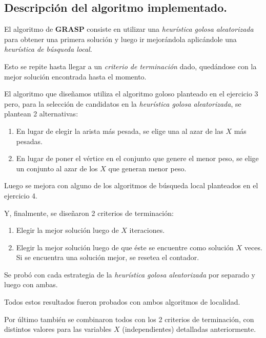 \subsection{Descripción del algoritmo implementado.}
\vspace*{0.3cm}

El algoritmo de \textbf{GRASP} consiste en utilizar una
\textit{heurística golosa aleatorizada} para obtener una primera solución
y luego ir mejorándola aplicándole una \textit{heurística de búsqueda local}.

Esto se repite hasta llegar a un \textit{criterio de terminación} dado,
quedándose con la mejor solución encontrada hasta el momento.

El algoritmo que diseñamos utiliza el algoritmo goloso planteado en el
ejercicio 3 pero, para la selección de candidatos en la \textit{heurística
golosa aleatorizada}, se plantean 2 alternativas:

\begin{enumerate}
\item En lugar de elegir la arista más pesada, se elige una al azar de las
$X$ más pesadas.

\item En lugar de poner el vértice en el conjunto que genere el menor peso,
se elige un conjunto al azar de los $X$ que generan menor peso.
\end{enumerate}

Luego se mejora con alguno de los algoritmos de búsqueda local planteados
en el ejercicio 4.

Y, finalmente, se diseñaron 2 criterios de terminación:

\begin{enumerate}
\item Elegir la mejor solución luego de $X$ iteraciones.

\item Elegir la mejor solución luego de que éste se encuentre como solución $X$
veces. Si se encuentra una solución mejor, se resetea el contador.
\end{enumerate}


Se probó con cada estrategia de la \textit{heurística golosa aleatorizada} por
separado y luego con ambas.

Todos estos resultados fueron probados con ambos algoritmos de localidad.

Por último también se combinaron todos con los 2 criterios de terminación, con
distintos valores para las variables $X$ (independientes) detalladas
anteriormente.

